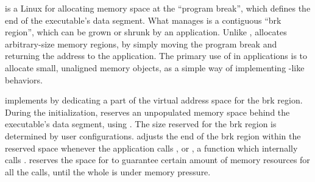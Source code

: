  is a Linux \linuxapi{} for 
allocating memory space at the ``program break'', which defines the end of the executable's data segment.
What  manages is a contiguous ``brk region'', which can be grown or shrunk by an application.
Unlike ,  allocates arbitrary-size memory regions, by simply moving the program break
and returning the address to the application.
The primary use of  in applications is %
to allocate small, unaligned memory objects,
as a simple way of implementing -like behaviors.





\thelibos{} implements  by dedicating a part of the virtual address space for the brk region.
During the initialization, \thelibos{} reserves an unpopulated memory space
behind the executable's data segment, using .
The size reserved for the brk region is determined
by user configurations.
\thelibos{} adjusts the end of the brk region
within the reserved space
whenever the application calls , or , a \libc{} function which internally calls .
\thelibos{} reserves the space for 
to guarantee certain amount of memory resources for all the  calls,
until the whole \picoproc{} is under memory pressure.





